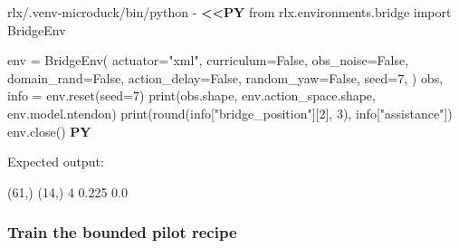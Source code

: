 \documentclass[
  american,
  11pt,
  letterpaper,
]{article}
\newenvironment{Shaded}{\begin{snugshade}}{\end{snugshade}}
\newcommand{\AttributeTok}[1]{\textcolor[rgb]{0.13,0.29,0.53}{#1}}
\newcommand{\ExtensionTok}[1]{#1}
\newcommand{\NormalTok}[1]{#1}
\newcommand{\OperatorTok}[1]{\textcolor[rgb]{0.81,0.36,0.00}{\textbf{#1}}}
\newcommand{\StringTok}[1]{\textcolor[rgb]{0.31,0.60,0.02}{#1}}
\renewenvironment{Shaded}{\par\smallskip}{\par\smallskip}
\begin{document}
\begin{Shaded}
\begin{Highlighting}[]
\ExtensionTok{rlx/.venv{-}microduck/bin/python} \AttributeTok{{-}} \OperatorTok{\textless{}\textless{}\textquotesingle{}PY\textquotesingle{}}
\StringTok{from rlx.environments.bridge import BridgeEnv}

\StringTok{env = BridgeEnv(}
\StringTok{    actuator="xml",}
\StringTok{    curriculum=False,}
\StringTok{    obs\_noise=False,}
\StringTok{    domain\_rand=False,}
\StringTok{    action\_delay=False,}
\StringTok{    random\_yaw=False,}
\StringTok{    seed=7,}
\StringTok{)}
\StringTok{obs, info = env.reset(seed=7)}
\StringTok{print(obs.shape, env.action\_space.shape, env.model.ntendon)}
\StringTok{print(round(info["bridge\_position"][2], 3), info["assistance"])}
\StringTok{env.close()}
\OperatorTok{PY}
\end{Highlighting}
\end{Shaded}

Expected output:

\begin{Shaded}
\begin{Highlighting}[]
\NormalTok{(61,) (14,) 4}
\NormalTok{0.225 0.0}
\end{Highlighting}
\end{Shaded}

\subsubsection{Train the bounded pilot
recipe}\label{train-the-bounded-pilot-recipe}
\end{document}
